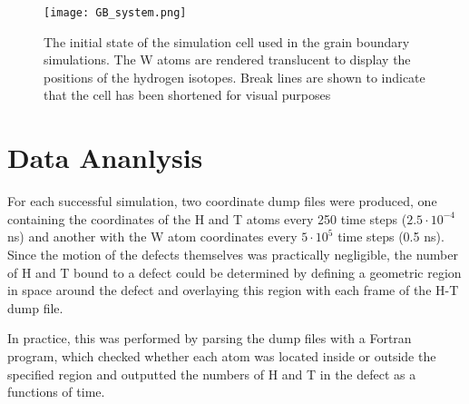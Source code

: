\begin{figure}[!ht]
\center
\texttt{[image: GB\_system.png]}
\caption{The initial state of the simulation cell used in the grain boundary simulations. 
The W atoms are rendered translucent to display the positions of the hydrogen isotopes. Break lines are shown to indicate that the cell has been shortened for visual purposes}
\label{Fig:GB_system}
\end{figure}

\section{Data Ananlysis}

For each successful simulation, two coordinate dump files were produced, one containing the coordinates of the H and T atoms every 250 time steps ($2.5\cdot 10^{-4}$ ns) and another with the W atom coordinates every $5\cdot 10^5$ time steps (0.5 ns).
Since the motion of the defects themselves was practically negligible, the number of H and T bound to a defect could be determined by defining a geometric region in space around the defect and overlaying this region with each frame of the H-T dump file.

In practice, this was performed by parsing the dump files with a Fortran program, which checked whether each atom was located inside or outside the specified region and outputted the numbers of H and T in the defect as a functions of time.

